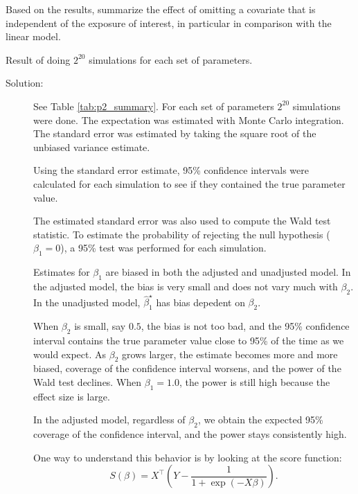 \documentclass[letterpaper,11pt]{article}
\begin{document}
\begin{enumerate}
  Based on the results, summarize the effect of omitting a covariate that is
  independent of the exposure of interest, in particular in comparison with the
  linear model.

  \begin{table}
    \scriptsize
    \centering
    
    \caption{Result of doing $2^{20}$ simulations for each set of parameters.}
    \label{tab:p2_summary}
  \end{table}
  
  \begin{description}
  \item[Solution:] See Table \ref{tab:p2_summary}. For each set of parameters
    $2^{20}$ simulations were done. The expectation was estimated with Monte
    Carlo integration. The standard error was estimated by taking the square root
    of the unbiased variance estimate.
    
    Using the standard error estimate, 95\% confidence intervals were calculated
    for each simulation to see if they contained the true parameter value.

    The estimated standard error was also used to compute the Wald test
    statistic. To estimate the probability of rejecting the null hypothesis
    ($\beta_1 = 0$), a 95\% test was performed for each simulation.

    Estimates for $\beta_1$ are biased in both the adjusted and unadjusted
    model. In the adjusted model, the bias is very small and does not vary much
    with $\beta_2$. In the unadjusted model, $\hat\beta_1^\star$ has bias
    depedent on $\beta_2$.

    When $\beta_2$ is small, say $0.5$, the bias is not too bad, and the 95\%
    confidence interval contains the true parameter value close to 95\% of the
    time as we would expect. As $\beta_2$ grows larger, the estimate becomes
    more and more biased, coverage of the confidence interval worsens, and the
    power of the Wald test declines. When $\beta_1 = 1.0$, the power is still
    high because the effect size is large.

    In the adjusted model, regardless of $\beta_2$, we obtain the expected 95\%
    coverage of the confidence interval, and the power stays consistently high.

    One way to understand this behavior is by looking at the score function:
    \begin{equation}
      S\left(\beta\right) = X^\intercal\left(
        Y - \frac{1}{1 + \exp\left(-X\beta\right)}
      \right).
      \label{eqn:p2_score}
    \end{equation}


\end{description}
\end{enumerate}
\end{document}

